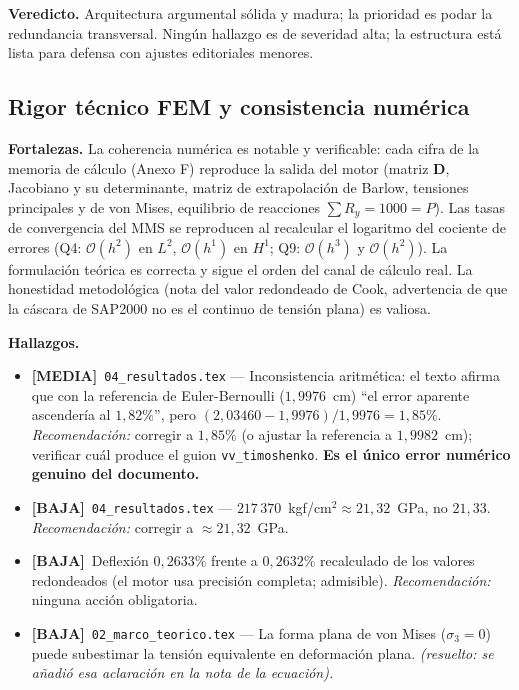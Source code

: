 \documentclass[11pt,a4paper]{article}
\newcommand{\sevmedia}{\textcolor{cMedia}{\textbf{[MEDIA]}}}
\newcommand{\sevbaja}{\textcolor{cBaja}{\textbf{[BAJA]}}}
\newcommand{\fileref}[1]{\texttt{\small #1}}
\begin{document}
\textbf{Veredicto.} Arquitectura argumental sólida y madura; la prioridad es podar la redundancia
transversal. Ningún hallazgo es de severidad alta; la estructura está lista para defensa con ajustes
editoriales menores.

\subsection{Rigor técnico FEM y consistencia numérica}

\textbf{Fortalezas.} La coherencia numérica es notable y verificable: cada cifra de la memoria de
cálculo (Anexo F) reproduce la salida del motor (matriz $\bm{D}$, Jacobiano y su determinante, matriz
de extrapolación de Barlow, tensiones principales y de von Mises, equilibrio de reacciones
$\sum R_y = 1000 = P$). Las tasas de convergencia del MMS se reproducen al recalcular el logaritmo del
cociente de errores (Q4: $\mathcal{O}(h^{2})$ en $L^2$, $\mathcal{O}(h^{1})$ en $H^1$; Q9:
$\mathcal{O}(h^{3})$ y $\mathcal{O}(h^{2})$). La formulación teórica es correcta y sigue el orden del
canal de cálculo real. La honestidad metodológica (nota del valor redondeado de Cook, advertencia de
que la cáscara de SAP2000 no es el continuo de tensión plana) es valiosa.

\textbf{Hallazgos.}
\begin{itemize}
  \item \sevmedia\ \fileref{04\_resultados.tex} — Inconsistencia aritmética: el texto afirma que con la referencia de Euler-Bernoulli ($1{,}9976$~cm) ``el error aparente ascendería al $1{,}82\%$'', pero $(2{,}03460-1{,}9976)/1{,}9976 = 1{,}85\%$. \textit{Recomendación:} corregir a $1{,}85\%$ (o ajustar la referencia a $1{,}9982$~cm); verificar cuál produce el guion \fileref{vv\_timoshenko}. \textbf{Es el único error numérico genuino del documento.}
  \item \sevbaja\ \fileref{04\_resultados.tex} — $217\,370$~kgf/cm$^2 \approx 21{,}32$~GPa, no $21{,}33$. \textit{Recomendación:} corregir a $\approx 21{,}32$~GPa.
  \item \sevbaja\ Deflexión $0{,}2633\%$ frente a $0{,}2632\%$ recalculado de los valores redondeados (el motor usa precisión completa; admisible). \textit{Recomendación:} ninguna acción obligatoria.
  \item \sevbaja\ \fileref{02\_marco\_teorico.tex} — La forma plana de von Mises ($\sigma_3=0$) puede subestimar la tensión equivalente en deformación plana. \textit{(resuelto: se añadió esa aclaración en la nota de la ecuación).}
\end{itemize}
\end{document}
